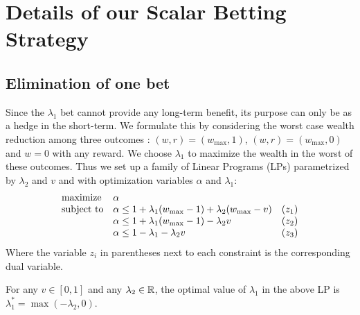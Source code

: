 \section{Details of our Scalar Betting Strategy}
\subsection{Elimination of one bet} \label{app:betaopt}
Since the $\lambda_1$ bet cannot provide any long-term benefit, its purpose can only be as a hedge in the short-term. 
We formulate this by considering the
worst case wealth reduction among three outcomes :
$(w,r)=(w_{\max},1)$, 
$(w,r)=(w_{\max},0)$ and $w=0$ with any reward. 
We choose $\lambda_1$ to maximize the wealth 
in the worst of these outcomes. Thus we set 
up a family of Linear Programs (LPs) 
parametrized by $\lambda_2$ and $v$ and with optimization variables $\alpha$ and $\lambda_1$:
\begin{equation*}
\begin{array}{ll@{}ll}
\text{maximize}  & \alpha &\\
\text{subject to}& \alpha \leq 1+\lambda_1(w_{\max}-1)+\lambda_2(w_{\max}-v)  & &(z_1) \\
                 & \alpha \leq 1+\lambda_1(w_{\max}-1)-\lambda_2 v            & &(z_2) \\
                 & \alpha \leq 1-\lambda_1-\lambda_2 v                        & &(z_3) \\
\end{array}
\end{equation*}
Where the variable $z_i$ in parentheses next to each constraint is the corresponding dual variable. 
\begin{theorem}
For any $v\in [0,1]$ and any $\lambda_2 \in \mathbb{R}$, the optimal value of $\lambda_1$ in the above LP is $\lambda_1^*=\max(-\lambda_2,0)$.
\end{theorem}
